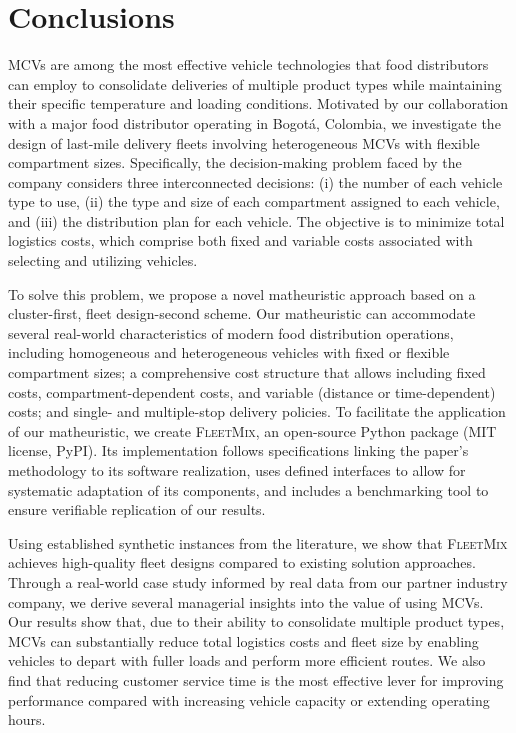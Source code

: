 \documentclass[11pt]{elsarticle}
\theoremstyle{plain}
\begin{document}
\section{Conclusions} \label{sec:conclusions}

\acfp{MCV} are among the most effective vehicle technologies that food distributors can employ to consolidate deliveries of multiple product types while maintaining their specific temperature and loading conditions. Motivated by our collaboration with a major food distributor operating in Bogotá, Colombia, we investigate the design of last-mile delivery fleets involving heterogeneous \acp{MCV} with flexible compartment sizes. Specifically, the decision-making problem faced by the company considers three interconnected decisions: (i) the number of each vehicle type to use, (ii) the type and size of each compartment assigned to each vehicle, and (iii) the distribution plan for each vehicle. The objective is to minimize total logistics costs, which comprise both fixed and variable costs associated with selecting and utilizing vehicles.

To solve this problem, we propose a novel matheuristic approach based on a cluster-first, fleet design-second scheme. Our matheuristic can accommodate several real-world characteristics of modern food distribution operations, including homogeneous and heterogeneous vehicles with fixed or flexible compartment sizes; a comprehensive cost structure that allows including fixed costs, compartment-dependent costs, and variable (distance or time-dependent) costs; and single- and multiple-stop delivery policies. To facilitate the application of our matheuristic, we create \textsc{FleetMix}, an open-source Python package (MIT license, PyPI). Its implementation follows specifications linking the paper's methodology to its software realization, uses defined interfaces to allow for systematic adaptation of its components, and includes a benchmarking tool to ensure verifiable replication of our results.

Using established synthetic instances from the literature, we show that \textsc{FleetMix} achieves high-quality fleet designs compared to existing solution approaches. Through a real-world case study informed by real data from our partner industry company, we derive several managerial insights into the value of using \acp{MCV}. Our results show that, due to their ability to consolidate multiple product types, \acp{MCV} can substantially reduce total logistics costs and fleet size by enabling vehicles to depart with fuller loads and perform more efficient routes. We also find that reducing customer service time is the most effective lever for improving performance compared with increasing vehicle capacity or extending operating hours.
\end{document}

